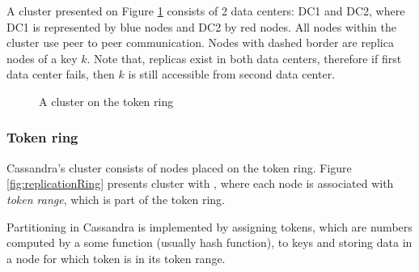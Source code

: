 A cluster presented on Figure \ref{fig:archCluster} consists of 2 data centers: DC1 and DC2, where DC1 is represented by blue nodes and DC2 by red nodes. All nodes within the cluster use peer to peer communication. Nodes with dashed border are replica nodes of a key $k$. Note that, replicas exist in both data centers, therefore if first data center fails, then $k$ is still accessible from second data center.

\begin{figure}[H]
\centering
{}
\caption{A cluster on the token ring}
\label{fig:archCluster}
\end{figure}

\subsubsection{Token ring}
Cassandra's cluster consists of nodes placed on the token ring. Figure \ref{fig:replicationRing} presents cluster with , where each node is associated with \emph{token range}, which is part of the token ring. 

Partitioning in Cassandra is implemented by assigning tokens, which are numbers computed by a some function (usually hash function), to keys and storing data in a node for which token is in its token range. 

